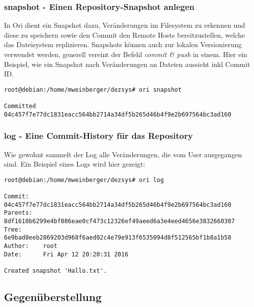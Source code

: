\subsubsection{snapshot - Einen Repository-Snapshot anlegen}
\label{subsubsec:snapshot - Einen Repository-Snapshot anlegen}
In Ori dient ein Snapshot dazu, Veränderungen im Filesystem zu erkennen und diese zu speichern sowie den Commit den Remote Hosts bereitzustellen, welche das Dateisystem replizieren. Snapshots können auch zur lokalen Versionierung verwendet werden, generell vereint der Befehl \textit{commit \& push} in einem. Hier ein Beispiel, wie ein Snapshot nach Veränderungen an Dateien aussieht inkl Commit ID.
\begin{lstlisting}[frame=single, caption=snapshot]
root@debian:/home/mweinberger/dezsys# ori snapshot

Committed 04c457f7e77dc1831eacc564bb2714a34df5b265d46b4f9e2b697564bc3ad160
\end{lstlisting}

\subsubsection{log - Eine Commit-History für das Repository}
\label{subsubsec:log - Eine Commit-History für das Repository}
Wie gewohnt sammelt der Log alle Veränderungen, die vom User ausgegangen sind. Ein Beispiel eines Logs wird hier gezeigt:
\begin{lstlisting}[frame=single, caption=log]
root@debian:/home/mweinberger/dezsys# ori log

Commit:    04c457f7e77dc1831eacc564bb2714a34df5b265d46b4f9e2b697564bc3ad160
Parents:   8df1610b6299e4bf086eae0cf473c12326ef49aeed6a3e4eed4656e3832660307
Tree:      6e9bad8eeb2869203d968f6aed02c4e79e913f6535094d8f512565bf1b8a1b58
Author:    root
Date:      Fri Apr 12 20:20:31 2016

Created snapshot 'Hallo.txt'.
\end{lstlisting}


\subsection{Gegenüberstellung}
\label{subsec:Gegenüberstellung}

%
%
%
